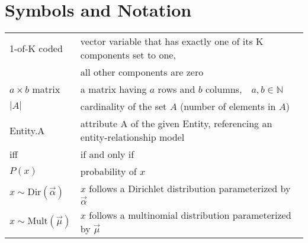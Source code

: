 \section*{Symbols and Notation}

\begin{tabular}{ll}
1-of-K coded & vector variable that has exactly one of its K components set to one,\\ & all other components are zero\\
$a \times b$ matrix & a matrix having $a$ rows and $b$ columns,\ \ $a, b \in \mathbb{N}$\\
$|A|$ & cardinality of the set $A$ (number of elements in $A$)\\
Entity.A & attribute A of the given Entity, referencing an entity-relationship model\\
iff & if and only if\\
$P(x)$ & probability of $x$\\
$x \sim \text{Dir}(\vec \alpha)$ & $x$ follows a Dirichlet distribution parameterized by $\vec \alpha$\\
$x \sim \text{Mult}(\vec \mu)$ & $x$ follows a multinomial distribution parameterized by $\vec \mu$
\end{tabular}

